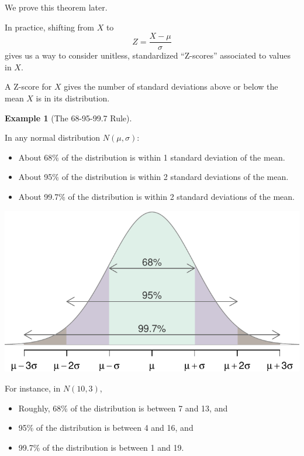 \documentclass[
]{book}
\providecommand{\tightlist}{%
  \setlength{\itemsep}{0pt}\setlength{\parskip}{0pt}}
\theoremstyle{definition}
\theoremstyle{definition}
\newtheorem{example}{Example}[chapter]
\theoremstyle{definition}
\theoremstyle{definition}
\theoremstyle{remark}
\begin{document}
We prove this theorem later.

In practice, shifting from \(X\) to \[Z = \frac{X-\mu}{\sigma}\] gives us a way to consider unitless, standardized ``Z-scores'' associated to values in \(X\).

A Z-score for \(X\) gives the number of standard deviations above or below the mean \(X\) is in its distribution.

\begin{example}[The 68-95-99.7 Rule]
\protect\hypertarget{exm:normal-rule-of-thumb}{}\label{exm:normal-rule-of-thumb}

In any normal distribution \(N(\mu, \sigma)\):

\begin{itemize}
\tightlist
\item
  About 68\% of the distribution is within 1 standard deviation of the mean.
\item
  About 95\% of the distribution is within 2 standard deviations of the mean.
\item
  About 99.7\% of the distribution is within 2 standard deviations of the mean.
\end{itemize}

\includegraphics{math340-notes_files/figure-latex/unnamed-chunk-19-1.pdf}

For instance, in \(N(10,3)\),

\begin{itemize}
\tightlist
\item
  Roughly, 68\% of the distribution is between 7 and 13, and
\item
  95\% of the distribution is between 4 and 16, and
\item
  99.7\% of the distribution is between 1 and 19.
\end{itemize}

\end{example}
\end{document}
